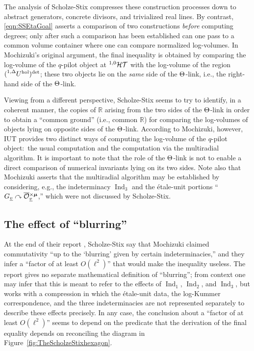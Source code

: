 \documentclass[12pt, reqno, a4paper]{amsart}
\def\udl#1{\underline{#1}} %
\def\acton{\curvearrowright} %
\def\bR{\mathbb{R}} %
\def\uv{\udl{v}} %
\DeclareMathOperator{\hol}{hol}
\DeclareMathOperator{\Ind}{Ind}
\def\IndOne{\Ind_1}
\def\IndTwo{\Ind_2}
\def\IndThree{\Ind_3}
\begin{document}
The analysis of Scholze-Stix compresses these construction processes down to
abstract generators, concrete divisors, and trivialized real lines.
By contrast, \eqref{eqn:SSEtaGoal} asserts a comparison of two constructions \textit{before} computing degrees; only after such a comparison has been established can one pass to a common volume container where one can compare normalized log-volumes. 
In Mochizuki's original argument, the final inequality is obtained by comparing the log-volume of the $q$-pilot object at $\HT[1,0]$ with the log-volume of the region $(\prescript{1,\Delta}{}{U}^{\hol})^{\det}$; these two objects lie on the \textit{same} side of the $\Th$-link, i.e., the right-hand side of the $\Th$-link.  

Viewing from a different perspective, Scholze-Stix seems to try to identify, in a coherent manner, the copies of $\mathbb{R}$ arising from the two sides of the $\Th$-link in order to obtain a ``common ground'' (i.e., common $\bR$) for comparing the log-volumes of objects lying on opposite sides of the $\Th$-link.
According to Mochizuki, however, IUT provides two distinct ways of computing the log-volume of the $q$-pilot object:\ the usual computation and the computation via the multiradial algorithm. It is important to note that the role of the $\Th$-link is not to enable a direct comparison of numerical invariants lying on its two sides. Note also that Mochizuki asserts that the multiradial algorithm may be established by considering, e.g., the indeterminacy $\IndThree$ and the \'etale-unit portions ``$\GG_{\uv} \acton \oOOxmu_{\uv}$,'' which were not discussed by Scholze-Stix.  


\subsection{The effect of ``blurring''}\label{sub:SSBlurringNew}

At the end of their report \cite[p.~10]{Scholze2018WhyA}, Scholze-Stix say that Mochizuki claimed commutativity ``up to the `blurring' given by certain indeterminacies,'' and they infer a ``factor of at least $O(\ell^2)$'' that would make the inequality useless. 
The report gives no separate mathematical definition of ``blurring'';
from context one may infer that this is meant to refer to the effects of $\IndOne$, $\IndTwo$, and $\IndThree$, but \cite{Scholze2018WhyA} works with a compression in which the \'etale-unit data, the log-Kummer correspondence, and the three indeterminacies are not represented separately to describe these effects precisely. In any case, the conclusion about a ``factor of at least $O(\ell^2)$'' seems to depend on the predicate that the derivation of the final equality depends on reconciling the diagram in Figure~\ref{fig:TheScholzeStixhexagon}.
\end{document}
